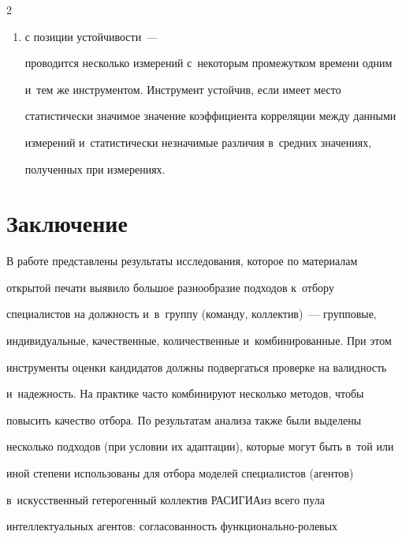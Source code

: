 \begin{multicols}{2}
\begin{itemize}
\begin{enumerate}[(1)]
инструмента с~общим результатом~\cite{33-r}; 

\item с позиции устой\-чи\-вости~--- 

проводится несколько измерений с~некоторым промежутком времени одним 

и~тем же инструментом. Инструмент устойчив, если имеет мес\-то 

статистически значимое значение коэффициента корреляции между данными 

измерений и~статистически незначимые различия в~сред\-них значениях, 

полученных при измерениях.

\end{enumerate}

\end{itemize}



\vspace*{-6pt}



\section{Заключение}



  В работе представлены результаты исследования, которое по материалам 

открытой печати выявило большое разнообразие подходов к~отбору 

специалистов на долж\-ность и~в~группу (команду, коллектив)~--- групповые, 

индивидуальные, качественные, количественные и~комбинированные. При этом 

инструменты оценки кандидатов должны подвергаться проверке на ва\-лид\-ность

 и~на\-деж\-ность. На практике часто комбинируют несколько методов, чтобы 

повысить качество отбора. По результатам анализа так\-же были выделены 

несколько подходов (при условии их адаптации), которые могут быть в~той или 

иной степени использованы для отбора моделей специалистов (агентов) 

в~искусственный гетерогенный коллектив \mbox{РАСИГИА}\linebreak из всего пула 

интеллектуальных агентов: со\-гла\-со\-ван\-ность функ\-цио\-наль\-но-ро\-ле\-вых 


\end{multicols}
